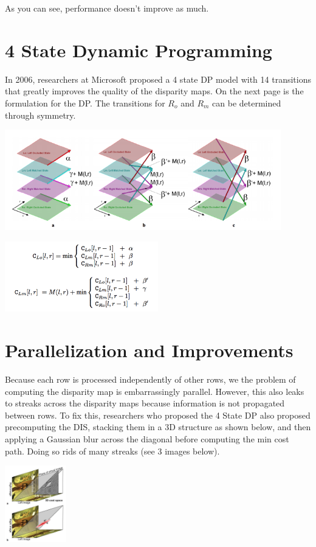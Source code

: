 \documentclass{article}
\begin{document}
As you can see, performance doesn't improve as much.

\section{4 State Dynamic Programming}
In 2006, researchers at Microsoft proposed a 4 state DP model with 14 transitions that greatly improves the quality of the disparity maps. On the next page is the formulation for the DP. The transitions for $R_o$ and $R_m$ can be determined through symmetry.

\begin{center}
    \includegraphics[width=0.9\textwidth]{DP4I.png}
\end{center}

\begin{center}
    \includegraphics[width=0.5\textwidth]{DP4.png}
\end{center}

\section{Parallelization and Improvements}
Because each row is processed independently of other rows, we the problem of computing the disparity map is embarrassingly parallel. However, this also leaks to streaks across the disparity maps because information is not propagated between rows. To fix this, researchers who proposed the 4 State DP also proposed precomputing the DIS, stacking them in a 3D structure as shown below, and then applying a Gaussian blur across the diagonal before computing the min cost path. Doing so rids of many streaks (see 3 images below).

\begin{center}
    \includegraphics[width=0.2\textwidth]{blur.png}
\end{center}
\end{document}
